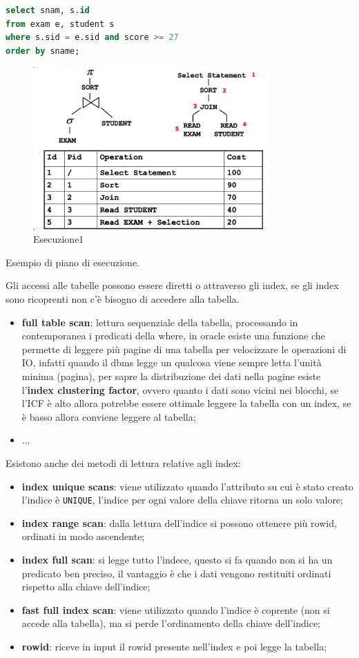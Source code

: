 \documentclass[12pt]{article}
\begin{document}
\begin{lstlisting}[language=sql]
select snam, s.id
from exam e, student s
where s.sid = e.sid and score >= 27
order by sname;
\end{lstlisting}
\begin{figure}[H]
    \centering
    \includegraphics[width=0.8\textwidth]{esecuzione1.png}
    \caption{Esecuzione1}
    \label{fig:esecuzione1}
\end{figure}
Esempio di piano di esecuzione.


Gli accessi alle tabelle possono essere diretti o attraverso gli index, se gli index sono ricoprenti non c'\`e bisogno di accedere alla tabella.
\begin{itemize}
    \item \textbf{full table scan}: lettura sequenziale della tabella, processando in contemporanea i predicati della where, in oracle esiste una funzione che permette di leggere pi\`u pagine di una tabella per velocizzare le operazioni di IO, infatti quando il dbms legge un qualcosa viene sempre letta l'unit\`a minima (pagina), per sapre la distribuzione dei dati nella pagine esiste l'\textbf{index clustering factor}, ovvero quanto i dati sono vicini nei blocchi, se l'ICF \`e alto allora potrebbe essere ottimale leggere la tabella con un index, se \`e basso allora conviene leggere al tabella;
    \item ...
\end{itemize}

Esistono anche dei metodi di lettura relative agli index:
\begin{itemize}
    \item \textbf{index unique scans}: viene utilizzato quando l'attributo su cui \`e stato creato l'indice \`e \texttt{UNIQUE}, l'indice per ogni valore della chiave ritorna un solo valore;
    \item \textbf{index range scan}: dalla lettura dell'indice si possono ottenere pi\`u rowid, ordinati in modo ascendente;
    \item \textbf{index full scan}: si legge tutto l'indece, questo si fa quando non si ha un predicato ben preciso, il vantaggio \`e che i dati vengono restituiti ordinati rispetto alla chiave dell'indice;
    \item \textbf{fast full index scan}: viene utilizzato quando l'indice \`e coprente (non si accede alla tabella), ma si perde l'ordinamento della chiave dell'indice;
    \item \textbf{rowid}: riceve in input il rowid presente nell'index e poi legge la tabella;
\end{itemize}
\end{document}
